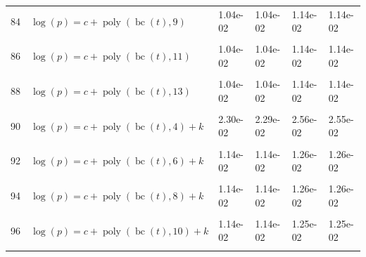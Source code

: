 \documentclass[12pt,a4paper]{article}
\DeclareMathOperator{\bc}{bc}
\DeclareMathOperator{\poly}{poly}
\begin{document}
\begin{longtable}[t]{ll>{\raggedleft\arraybackslash}p{2cm}>{\raggedleft\arraybackslash}p{2cm}>{\raggedleft\arraybackslash}p{2cm}>{\raggedleft\arraybackslash}p{2cm}}
84 & $\log(p) = c + \poly\left( \bc(t), 9 \right)$ & 1.04e-02 & 1.04e-02 & 1.14e-02 & 1.14e-02\\
\cellcolor{gray!6}{85} & \cellcolor{gray!6}{$\log(p) = c + \poly\left( \bc(t), 10 \right)$} & \cellcolor{gray!6}{1.04e-02} & \cellcolor{gray!6}{1.04e-02} & \cellcolor{gray!6}{1.14e-02} & \cellcolor{gray!6}{1.14e-02}\\
86 & $\log(p) = c + \poly\left( \bc(t), 11 \right)$ & 1.04e-02 & 1.04e-02 & 1.14e-02 & 1.14e-02\\
\cellcolor{gray!6}{87} & \cellcolor{gray!6}{$\log(p) = c + \poly\left( \bc(t), 12 \right)$} & \cellcolor{gray!6}{1.04e-02} & \cellcolor{gray!6}{1.04e-02} & \cellcolor{gray!6}{1.14e-02} & \cellcolor{gray!6}{1.14e-02}\\
88 & $\log(p) = c + \poly\left( \bc(t), 13 \right)$ & 1.04e-02 & 1.04e-02 & 1.14e-02 & 1.14e-02\\
\cellcolor{gray!6}{89} & \cellcolor{gray!6}{$\log(p) = c + \poly\left( \bc(t), 3 \right) + k$} & \cellcolor{gray!6}{3.66e-02} & \cellcolor{gray!6}{1.97e-02} & \cellcolor{gray!6}{4.08e-02} & \cellcolor{gray!6}{2.18e-02}\\
90 & $\log(p) = c + \poly\left( \bc(t), 4 \right) + k$ & 2.30e-02 & 2.29e-02 & 2.56e-02 & 2.55e-02\\
\cellcolor{gray!6}{91} & \cellcolor{gray!6}{$\log(p) = c + \poly\left( \bc(t), 5 \right) + k$} & \cellcolor{gray!6}{1.46e-02} & \cellcolor{gray!6}{1.26e-02} & \cellcolor{gray!6}{1.62e-02} & \cellcolor{gray!6}{1.40e-02}\\
92 & $\log(p) = c + \poly\left( \bc(t), 6 \right) + k$ & 1.14e-02 & 1.14e-02 & 1.26e-02 & 1.26e-02\\
\cellcolor{gray!6}{93} & \cellcolor{gray!6}{$\log(p) = c + \poly\left( \bc(t), 7 \right) + k$} & \cellcolor{gray!6}{1.15e-02} & \cellcolor{gray!6}{1.15e-02} & \cellcolor{gray!6}{1.28e-02} & \cellcolor{gray!6}{1.27e-02}\\
94 & $\log(p) = c + \poly\left( \bc(t), 8 \right) + k$ & 1.14e-02 & 1.14e-02 & 1.26e-02 & 1.26e-02\\
\cellcolor{gray!6}{95} & \cellcolor{gray!6}{$\log(p) = c + \poly\left( \bc(t), 9 \right) + k$} & \cellcolor{gray!6}{1.14e-02} & \cellcolor{gray!6}{1.14e-02} & \cellcolor{gray!6}{1.25e-02} & \cellcolor{gray!6}{1.25e-02}\\
96 & $\log(p) = c + \poly\left( \bc(t), 10 \right) + k$ & 1.14e-02 & 1.14e-02 & 1.25e-02 & 1.25e-02\\
\cellcolor{gray!6}{97} & \cellcolor{gray!6}{$\log(p) = c + \poly\left( \bc(t), 11 \right) + k$} & \cellcolor{gray!6}{1.14e-02} & \cellcolor{gray!6}{1.14e-02} & \cellcolor{gray!6}{1.25e-02} & \cellcolor{gray!6}{1.25e-02}\\

\end{longtable}
\end{document}
